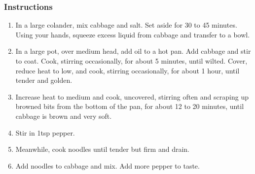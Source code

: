 \documentclass[11pt]{article}
\begin{document}
\subsubsection*{Instructions}
\label{sec:org411e264}
\begin{enumerate}
\item In a large colander, mix cabbage and salt.  Set aside for 30 to 45
minutes.  Using your hands, squeeze excess liquid from cabbage and
transfer to a bowl.
\item In a large pot, over medium head, add oil to a hot pan.  Add
cabbage and stir to coat.  Cook, stirring occasionally, for about 5
minutes, until wilted.  Cover, reduce heat to low, and cook,
stirring occasionally, for about 1 hour, until tender and golden.
\item Increase heat to medium and cook, uncovered, stirring often and
scraping up browned bits from the bottom of the pan, for about 12
to 20 minutes, until cabbage is brown and very soft.
\item Stir in 1tsp pepper.
\item Meanwhile, cook noodles until tender but firm and drain.
\item Add noodles to cabbage and mix.  Add more pepper to taste.
\end{enumerate}
\end{document}
